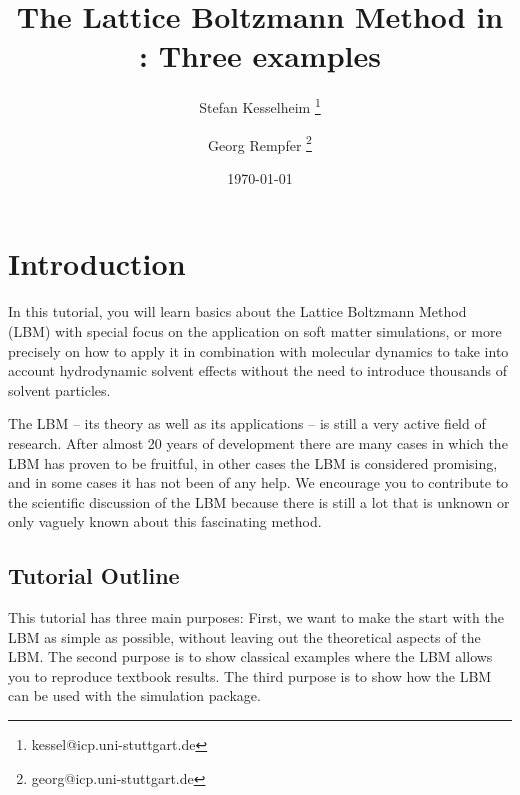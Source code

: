 \renewcommand{\d}{\mathrm d}
\subject{ESPResSo Tutorial}
\title{The Lattice Boltzmann Method in \ES{}: Three examples } \author{ Stefan Kesselheim \thanks{\ttfamily 
kessel@icp.uni-stuttgart.de}  \and  Georg Rempfer \thanks{\ttfamily 
georg@icp.uni-stuttgart.de}}
\date{\today}
\publishers{Institute for Computational Physics, Stuttgart University}

\maketitle \tableofcontents


\chapter{Introduction}
In this tutorial, you will learn basics about the 
Lattice Boltzmann Method (LBM) with special focus on the application
on soft matter simulations, or more precisely on how to apply it 
in combination with molecular dynamics to take into account 
hydrodynamic solvent effects without the need to introduce
thousands of solvent particles. 

The LBM -- its theory as well as its applications -- is 
still a very active field of research. After almost 20 years
of development there are many cases in which the LBM has proven
to be fruitful, in other cases the LBM is considered promising,
and in some cases it has not been of any help. We
encourage you to contribute to the scientific discussion 
of the LBM because there is still a lot 
that is unknown or only vaguely known about this fascinating
method. 

\section{Tutorial Outline}
This tutorial has three main purposes: First, we want to make the start
with the LBM as simple as possible, without leaving out the theoretical
aspects of the LBM.
The second purpose is to show classical examples where the LBM allows 
you to reproduce textbook results.
The third purpose is to show how the LBM can be used with the
\ES{} simulation package. 

